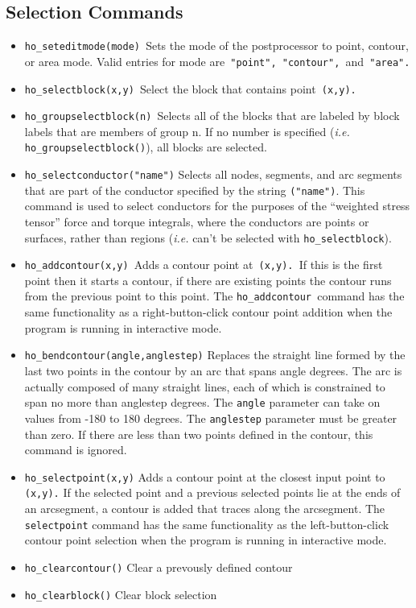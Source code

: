 \subsection{Selection Commands}

\begin{itemize}
\item \texttt{ho\_seteditmode(mode) }Sets the mode of the postprocessor to point,
contour, or area mode. Valid entries for mode are\texttt{ "point",
"contour", }and\texttt{ "area". }

\item \texttt{ho\_selectblock(x,y) }Select the block that contains point\texttt{
(x,y).}

\item \texttt{ho\_groupselectblock(n) }Selects all of the blocks that are labeled by
block labels that are members of group n. If no number is specified
({\em i.e.} \texttt{ho\_groupselectblock()}), all blocks are selected.

\item \texttt{ho\_selectconductor("name")} Selects all nodes, segments, and arc
segments that are part of the conductor specified by the string
\texttt{("name")}. This command is used to select conductors for the
purposes of the ``weighted stress tensor'' force and torque
integrals, where the conductors are points or surfaces, rather than
regions ({\em i.e.} can't be selected with \texttt{ho\_selectblock}).

\item \texttt{ho\_addcontour(x,y) }Adds a contour point at\texttt{ (x,y). }If this is
the first point then it starts a contour, if there are existing
points the contour runs from the previous point to this point. The
\texttt{ho\_addcontour }command has the same functionality as a
right-button-click contour point addition when the program is
running in interactive mode.\texttt{ }

\item \texttt{ho\_bendcontour(angle,anglestep)} Replaces the straight line formed by
the last two points in the contour by an arc that spans angle
degrees. The arc is actually composed of many straight lines, each
of which is constrained to span no more than anglestep degrees. The
\texttt{angle} parameter can take on values from -180 to 180
degrees. The \texttt{anglestep} parameter must be greater than
zero. If there are less than two points defined in the contour,
this command is ignored.

\item \texttt{ho\_selectpoint(x,y)} Adds a contour point at the closest input point to
\texttt{(x,y).} If the selected point and a previous selected points lie at
the ends of an arcsegment, a contour is added that traces along the
arcsegment. The \texttt{selectpoint} command has the same
functionality as the left-button-click contour point selection when
the program is running in interactive mode.

\item \texttt{ho\_clearcontour()} Clear a prevously defined contour

\item \texttt{ho\_clearblock()} Clear block selection
\end{itemize}
